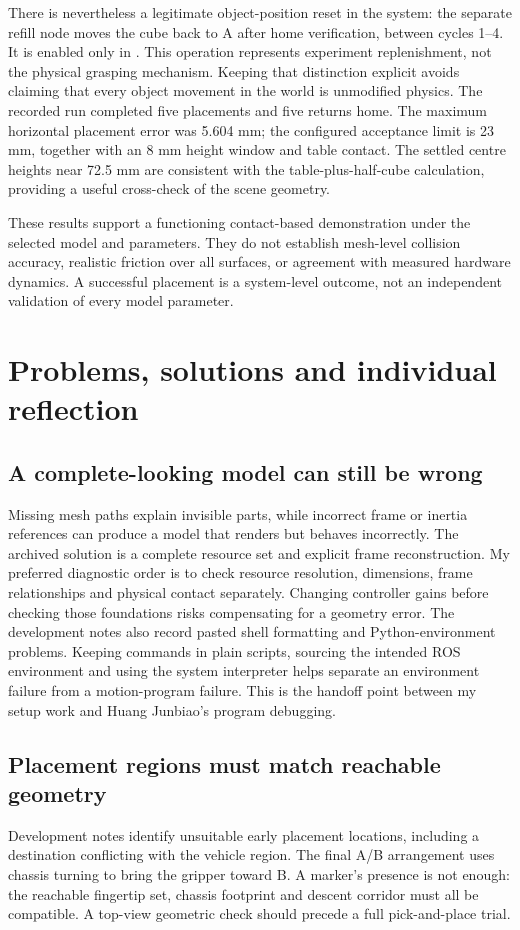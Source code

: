 There is nevertheless a legitimate object-position reset in the system: the separate refill node moves the cube back to A after home verification, between cycles 1--4. It is enabled only in . This operation represents experiment replenishment, not the physical grasping mechanism. Keeping that distinction explicit avoids claiming that every object movement in the world is unmodified physics.
\mainresults
The recorded run completed five placements and five returns home. The maximum horizontal placement error was 5.604 mm; the configured acceptance limit is 23 mm, together with an 8 mm height window and table contact. The settled centre heights near 72.5 mm are consistent with the table-plus-half-cube calculation, providing a useful cross-check of the scene geometry.

These results support a functioning contact-based demonstration under the selected model and parameters. They do not establish mesh-level collision accuracy, realistic friction over all surfaces, or agreement with measured hardware dynamics. A successful placement is a system-level outcome, not an independent validation of every model parameter.
\hardwareresult
\clearpage
\section{Problems, solutions and individual reflection}
\subsection{A complete-looking model can still be wrong}
Missing mesh paths explain invisible parts, while incorrect frame or inertia references can produce a model that renders but behaves incorrectly. The archived solution is a complete resource set and explicit frame reconstruction. My preferred diagnostic order is to check resource resolution, dimensions, frame relationships and physical contact separately. Changing controller gains before checking those foundations risks compensating for a geometry error.
The development notes also record pasted shell formatting and Python-environment problems. Keeping commands in plain scripts, sourcing the intended ROS environment and using the system interpreter helps separate an environment failure from a motion-program failure. This is the handoff point between my setup work and Huang Junbiao's program debugging.
\subsection{Placement regions must match reachable geometry}
Development notes identify unsuitable early placement locations, including a destination conflicting with the vehicle region. The final A/B arrangement uses chassis turning to bring the gripper toward B. A marker's presence is not enough: the reachable fingertip set, chassis footprint and descent corridor must all be compatible. A top-view geometric check should precede a full pick-and-place trial.
